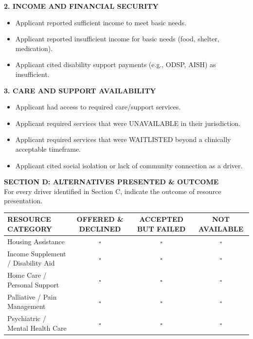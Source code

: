 \documentclass[11pt]{article}
\begin{document}
\noindent\textbf{2. INCOME AND FINANCIAL SECURITY}
\begin{itemize}
    \item[$\square$] Applicant reported sufficient income to meet basic needs.
    \item[$\square$] Applicant reported insufficient income for basic needs (food, shelter, medication).
    \item[$\square$] Applicant cited disability support payments (e.g., ODSP, AISH) as insufficient.
\end{itemize}

\noindent\textbf{3. CARE AND SUPPORT AVAILABILITY}
\begin{itemize}
    \item[$\square$] Applicant had access to required care/support services.
    \item[$\square$] Applicant required services that were UNAVAILABLE in their jurisdiction.
    \item[$\square$] Applicant required services that were WAITLISTED beyond a clinically acceptable timeframe.
    \item[$\square$] Applicant cited social isolation or lack of community connection as a driver.
\end{itemize}

\vspace{1em}
\noindent\textbf{\large SECTION D: ALTERNATIVES PRESENTED \& OUTCOME}\\[0.2em]
For every driver identified in Section C, indicate the outcome of resource presentation.

\vspace{0.5em}
\noindent\begin{tabularx}{\textwidth}{|l|c|c|c|}
\hline
\textbf{RESOURCE CATEGORY} & \textbf{OFFERED \& DECLINED} & \textbf{ACCEPTED BUT FAILED} & \textbf{NOT AVAILABLE} \\
\hline
Housing Assistance & $\square$ & $\square$ & $\square$ \\
\hline
Income Supplement / Disability Aid & $\square$ & $\square$ & $\square$ \\
\hline
Home Care / Personal Support & $\square$ & $\square$ & $\square$ \\
\hline
Palliative / Pain Management & $\square$ & $\square$ & $\square$ \\
\hline
Psychiatric / Mental Health Care & $\square$ & $\square$ & $\square$ \\
\hline
\end{tabularx}
\end{document}
